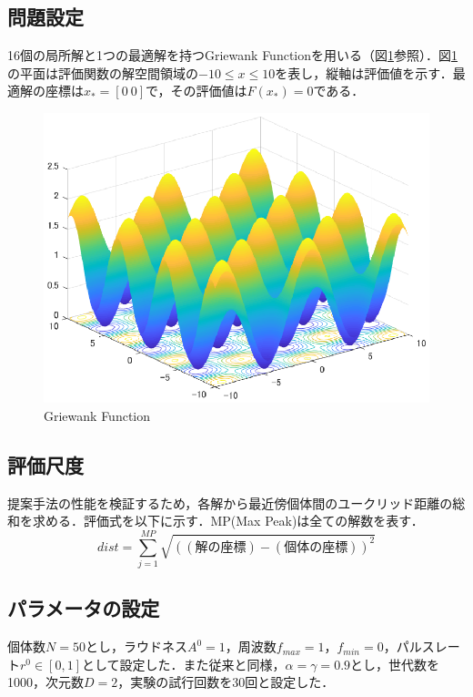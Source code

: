 \documentclass[twocolumn, a4paper]{UECIEresume}
\begin{document}
\subsection{問題設定}
16個の局所解と1つの最適解を持つGriewank Functionを用いる（図\ref{fig:griewank}参照）．図\ref{fig:griewank}の平面は評価関数の解空間領域の$-10 \leq x \leq 10$を表し，縦軸は評価値を示す．最適解の座標は$x_*=[0 \ 0]$で，その評価値は$F(x_*)=0$である．
\begin{figure}[t]
\begin{center}
\includegraphics[width=0.8\linewidth]{eps/griewank.eps}
\caption{Griewank Function}
\label{fig:griewank}
\end{center}
\end{figure}
\subsection{評価尺度}
提案手法の性能を検証するため，各解から最近傍個体間のユークリッド距離の総和を求める．評価式を以下に示す．MP(Max Peak)は全ての解数を表す．
\begin{equation}
dist = \sum_{j=1}^{MP} \sqrt{((解の座標)-(個体の座標))^2}
\end{equation}

\subsection{パラメータの設定}
個体数$N=50$とし，ラウドネス$A^0=1$，周波数$f_{max}=1$，${f_{min}=0}$，パルスレート$r^0 \in [0,1]$として設定した．また従来と同様，$\alpha= \gamma = 0.9$とし，世代数を1000，次元数$D=2$，実験の試行回数を30回と設定した．
\end{document}

